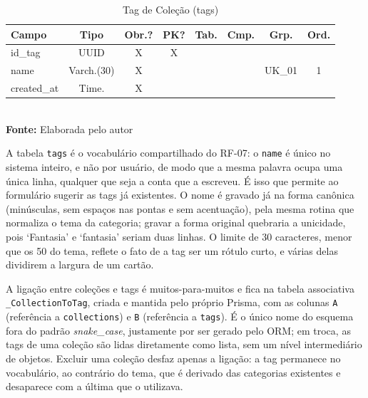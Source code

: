 \FloatBarrier
\begin{table}[!htbp]
\centering
\caption{Tag de Coleção (tags)}
\footnotesize
\begin{tabularx}{\textwidth}{ | X | c | c | c | c | c | c | c | }
    \hline
    \textbf{Campo} & \textbf{Tipo} & \textbf{Obr.?} & \textbf{PK?} & \textbf{Tab.} & \textbf{Cmp.} & \textbf{Grp.} & \textbf{Ord.}\\ \hline
    id\_tag & UUID & X & X &  &  &  &  \\ \hline
    name & Varch.(30) & X &  &  &  & UK\_01 & 1 \\ \hline
    created\_at & Time. & X &  &  &  &  &  \\ \hline
\end{tabularx}
\vspace{0.1cm} \\ \textbf{Fonte:} Elaborada pelo autor
\label{tab:tabelaTagDetalhado}
\end{table}

A tabela \texttt{tags} é o vocabulário compartilhado do RF-07: o \texttt{name} é único no sistema
inteiro, e não por usuário, de modo que a mesma palavra ocupa uma única linha, qualquer que seja a
conta que a escreveu. É isso que permite ao formulário sugerir as tags já existentes. O nome é
gravado já na forma canônica (minúsculas, sem espaços nas pontas e sem acentuação), pela mesma
rotina que normaliza o tema da categoria; gravar a forma original quebraria a unicidade, pois
`Fantasia' e `fantasia' seriam duas linhas. O limite de 30 caracteres, menor que os 50 do tema,
reflete o fato de a tag ser um rótulo curto, e várias delas dividirem a largura de um cartão.

A ligação entre coleções e tags é muitos-para-muitos e fica na tabela associativa
\texttt{\_CollectionToTag}, criada e mantida pelo próprio Prisma, com as colunas \texttt{A}
(referência a \texttt{collections}) e \texttt{B} (referência a \texttt{tags}). É o único nome do
esquema fora do padrão \textit{snake\_case}, justamente por ser gerado pelo ORM; em troca, as tags
de uma coleção são lidas diretamente como lista, sem um nível intermediário de objetos. Excluir uma
coleção desfaz apenas a ligação: a tag permanece no vocabulário, ao contrário do tema, que é
derivado das categorias existentes e desaparece com a última que o utilizava.

